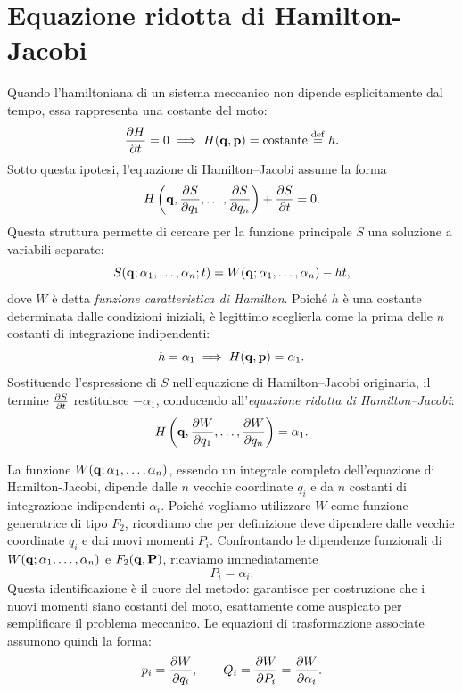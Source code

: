 \section{Equazione ridotta di Hamilton-Jacobi}

Quando l'hamiltoniana di un sistema meccanico non dipende esplicitamente dal tempo, essa rappresenta una costante del moto:
\begin{equation*}
    \pdv{H}{t} = 0 \implies H(\vb{q}, \vb{p}) = \text{costante} \overset{\mathrm{def}}{=} h.
\end{equation*}
Sotto questa ipotesi, l'equazione di Hamilton--Jacobi assume la forma
\begin{equation*}
    H\left( \vb{q}, \pdv{S}{q_1}, \dots, \pdv{S}{q_n} \right) + \pdv{S}{t} = 0.
\end{equation*}
Questa struttura permette di cercare per la funzione principale $S$ una soluzione a variabili separate:
\begin{equation*}
    S(\vb{q}; \alpha_1, \dots, \alpha_n; t) = W(\vb{q}; \alpha_1, \dots, \alpha_n) - h t,
\end{equation*}
dove $W$ è detta \emph{funzione caratteristica di Hamilton}. Poiché $h$ è una costante determinata dalle condizioni iniziali, è legittimo sceglierla come la prima delle $n$ costanti di integrazione indipendenti:
\begin{equation*}
    h = \alpha_1 \implies H(\vb{q}, \vb{p}) = \alpha_1.
\end{equation*}
Sostituendo l'espressione di $S$ nell'equazione di Hamilton--Jacobi originaria, il termine $\pdv{S}{t}$ restituisce $-\alpha_1$, conducendo all'\emph{equazione ridotta di Hamilton--Jacobi}:
\begin{equation}
    \label{eq:hamilton-jacobi-ridotta}
    H\left( \vb{q}, \pdv{W}{q_1}, \dots, \pdv{W}{q_n} \right) = \alpha_1.
\end{equation}

La funzione $W(\vb{q}; \alpha_1, \dots, \alpha_n)$, essendo un integrale completo dell'equazione di Hamilton-Jacobi, dipende dalle $n$ vecchie coordinate $q_i$ e da $n$ costanti di integrazione indipendenti $\alpha_i$. Poiché vogliamo utilizzare $W$ come funzione generatrice di tipo $F_2$, ricordiamo che per definizione deve dipendere dalle vecchie coordinate $q_i$ e dai nuovi momenti $P_i$. Confrontando le dipendenze funzionali di $W(\vb{q}; \alpha_1, \dots, \alpha_n)$ e $F_2(\vb{q}, \vb{P})$, ricaviamo immediatamente
\begin{equation*}
    P_i = \alpha_i.
\end{equation*}
Questa identificazione è il cuore del metodo: garantisce per costruzione che i nuovi momenti siano costanti del moto, esattamente come auspicato per semplificare il problema meccanico. Le equazioni di trasformazione associate assumono quindi la forma:
\begin{equation}\label{eq:trasformazione_W}
    p_i = \pdv{W}{q_i}, \qquad Q_i = \pdv{W}{P_i} = \pdv{W}{\alpha_i}.
\end{equation}

